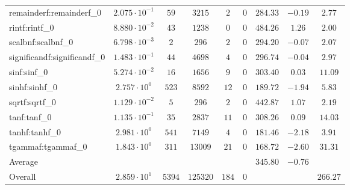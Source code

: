 \begin{tabular}{|l|c|c|c|c|c|c|c|c|}
remainderf:remainderf\_0     & $ 2.075 \cdot 10^{-1} $ & $ 59     $ & $ 3215   $ & $ 2   $ & $ 0   $ & $ 284.33      $ & $ -0.19   $ & $ 2.77    $ \\
rintf:rintf\_0               & $ 8.880 \cdot 10^{-2} $ & $ 43     $ & $ 1238   $ & $ 0   $ & $ 0   $ & $ 484.26      $ & $ 1.26    $ & $ 2.00    $ \\
scalbnf:scalbnf\_0           & $ 6.798 \cdot 10^{-3} $ & $ 2      $ & $ 296    $ & $ 2   $ & $ 0   $ & $ 294.20      $ & $ -0.07   $ & $ 2.07    $ \\
significandf:significandf\_0 & $ 1.483 \cdot 10^{-1} $ & $ 44     $ & $ 4698   $ & $ 4   $ & $ 0   $ & $ 296.74      $ & $ -0.04   $ & $ 2.97    $ \\
sinf:sinf\_0                 & $ 5.274 \cdot 10^{-2} $ & $ 16     $ & $ 1656   $ & $ 9   $ & $ 0   $ & $ 303.40      $ & $ 0.03    $ & $ 11.09   $ \\
sinhf:sinhf\_0               & $ 2.757 \cdot 10^{0}  $ & $ 523    $ & $ 8592   $ & $ 12  $ & $ 0   $ & $ 189.72      $ & $ -1.94   $ & $ 5.83    $ \\
sqrtf:sqrtf\_0               & $ 1.129 \cdot 10^{-2} $ & $ 5      $ & $ 296    $ & $ 2   $ & $ 0   $ & $ 442.87      $ & $ 1.07    $ & $ 2.19    $ \\
tanf:tanf\_0                 & $ 1.135 \cdot 10^{-1} $ & $ 35     $ & $ 2837   $ & $ 11  $ & $ 0   $ & $ 308.26      $ & $ 0.09    $ & $ 14.03   $ \\
tanhf:tanhf\_0               & $ 2.981 \cdot 10^{0}  $ & $ 541    $ & $ 7149   $ & $ 4   $ & $ 0   $ & $ 181.46      $ & $ -2.18   $ & $ 3.91    $ \\
tgammaf:tgammaf\_0           & $ 1.843 \cdot 10^{0}  $ & $ 311    $ & $ 13009  $ & $ 21  $ & $ 0   $ & $ 168.72      $ & $ -2.60   $ & $ 31.31   $ \\
\hline
Average                      & $                     $ & $        $ & $        $ & $     $ & $     $ & $ 345.80      $ & $ -0.76   $ & $         $ \\
\hline
Overall                      & $ 2.859 \cdot 10^{1}  $ & $ 5394   $ & $ 125320 $ & $ 184 $ & $ 0   $ & $             $ & $         $ & $ 266.27  $ \\
\hline
\end{tabular}
